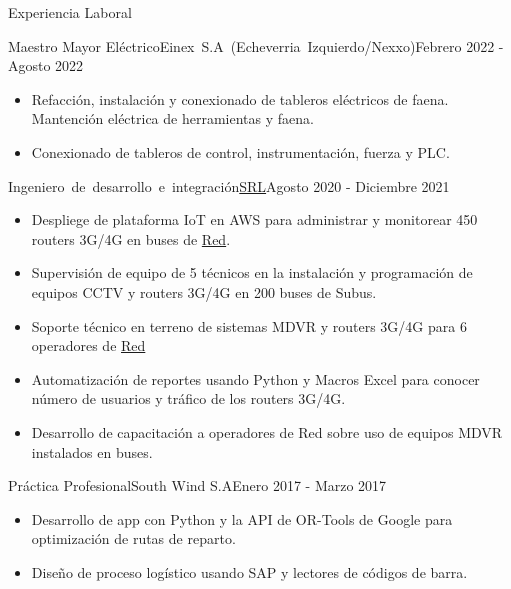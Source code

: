 \documentclass[]{mcdowellcv}
\begin{document}
	\makeheader
	
	\begin{cvsection}{Experiencia Laboral}
		\begin{cvsubsection}{Maestro Mayor Eléctrico}{\mbox{Einex S.A (Echeverria Izquierdo/Nexxo)}}{Febrero 2022 - Agosto 2022}		
			\begin{itemize}
				\item Refacción, instalación y conexionado de tableros eléctricos de faena. Mantención eléctrica de herramientas y faena.
				\item Conexionado de tableros de control, instrumentación, fuerza y PLC.
			\end{itemize}
		\end{cvsubsection}
		
		\begin{cvsubsection}{\mbox{Ingeniero de desarrollo e integración}}{\href{https://www.srl.cl/empresa/}{SRL}}{Agosto 2020 - Diciembre 2021}	
			\begin{itemize}
				\item Despliege de plataforma IoT en AWS para administrar y monitorear 450 routers 3G/4G en buses de \href{https://www.red.cl/}{Red}. 
				\item Supervisión de equipo de 5 técnicos en la instalación y programación de equipos CCTV y routers 3G/4G en 200 buses de Subus.
				\item Soporte técnico en terreno de sistemas MDVR y routers 3G/4G para 6 operadores de \href{https://www.red.cl/}{Red}
				\item Automatización de reportes usando Python y Macros Excel para conocer número de usuarios y tráfico de los routers 3G/4G.
				\item Desarrollo de capacitación a operadores de Red sobre uso de equipos MDVR instalados en buses.
			\end{itemize}
		\end{cvsubsection}
		
		\begin{cvsubsection}{Práctica Profesional}{South Wind S.A}{Enero 2017 - Marzo 2017}		
			\begin{itemize}
				\item Desarrollo de app con Python y la API de OR-Tools de Google para optimización de rutas de reparto.
				\item Diseño de proceso logístico usando SAP y lectores de códigos de barra.
			\end{itemize}
		\end{cvsubsection}
		
	\end{cvsection}
\end{document}
